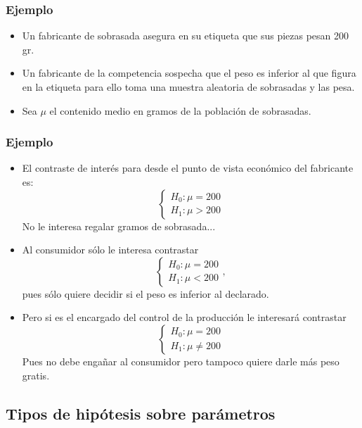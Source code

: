 \begin{frame}
\frametitle{Ejemplo}
\begin{itemize}
\item Un fabricante de sobrasada asegura en su etiqueta que sus piezas pesan 200 gr.
\item  Un fabricante de la competencia sospecha que el peso es inferior al que figura en la
etiqueta para ello toma una muestra aleatoria de sobrasadas y las pesa.
\item Sea $\mu$ el contenido medio en gramos de la población de sobrasadas.
\end{itemize}
\end{frame}

\begin{frame}
\frametitle{Ejemplo}
\begin{itemize}
\item  El contraste de interés para desde el punto de vista económico del fabricante es:
$$\left\{\begin{array}{ll} H_{0}:\mu=200\\ H_{1}:\mu>200
\end{array}\right.$$
No le interesa regalar gramos de sobrasada...
\item Al consumidor  sólo le interesa contrastar
$$\left\{\begin{array}{ll} H_{0}:\mu=200\\ H_{1}:\mu<200
\end{array}\right.,$$
pues sólo quiere decidir si el peso es inferior al declarado.
\item Pero si es el encargado del control de la producción le interesará contrastar
$$\left\{\begin{array}{ll} H_{0}:\mu=200\\ H_{1}:\mu\not=200
\end{array}\right.$$
Pues no debe engañar al consumidor pero tampoco quiere darle más peso gratis.
\end{itemize}
\end{frame}

\subsection{Tipos de hipótesis sobre parámetros}

